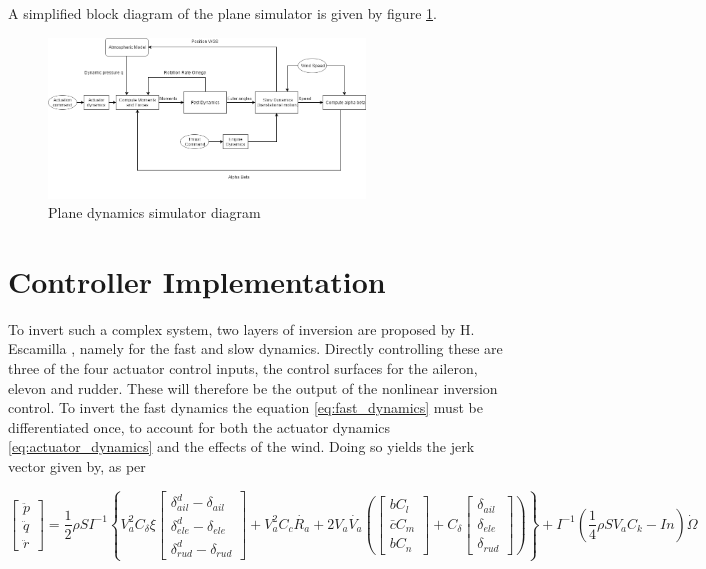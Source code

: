A simplified block diagram of the plane simulator is given by figure \ref{fig:plane_model}.
\begin{figure}[!htb]
  \centering
  \includegraphics[width=0.75\textwidth]{Figures/PlaneModel.png}
  \caption[Plane dynamics simulator diagram]{Plane dynamics simulator diagram}
  \label{fig:plane_model}
\end{figure}
 

\section{Controller Implementation}
\label{section:control_implement}

To invert such a complex system, two layers of inversion are proposed by H. Escamilla \cite{hector}, namely for the fast and slow dynamics. Directly controlling these are three of the four actuator control inputs, the control surfaces for the aileron, elevon and rudder. These will therefore be the output of the nonlinear inversion control. To invert the fast dynamics the equation \ref{eq:fast_dynamics} must be differentiated once, to account for both the actuator dynamics \ref{eq:actuator_dynamics} and the effects of the wind. Doing so yields the jerk vector given by, as per \cite{hector}

\begin{equation}
\begin{bmatrix}
\ddot{p}\\
\ddot{q}\\
\ddot{r}
\end{bmatrix}
= \dfrac{1}{2}\rho SI^{-1} \left\lbrace V_a^2 C_\delta \xi
\begin{bmatrix}
\delta^d_{ail}-\delta_{ail}\\
\delta^d_{ele}-\delta_{ele}\\
\delta^d_{rud}-\delta_{rud}
\end{bmatrix}
+V_a^2C_c\dot{R_a}+2V_a\dot{V_a}\left(
\begin{bmatrix}
bC_l\\
\bar{c}C_m\\
bC_n
\end{bmatrix}
+ C_\delta 
\begin{bmatrix}
\delta_{ail}\\
\delta_{ele}\\
\delta_{rud}
\end{bmatrix}
\right) \right \rbrace + I^{-1}\left(\dfrac{1}{4}\rho SV_aC_k-In\right)\dot{\Omega}
\label{eq:jerk}
\end{equation}

